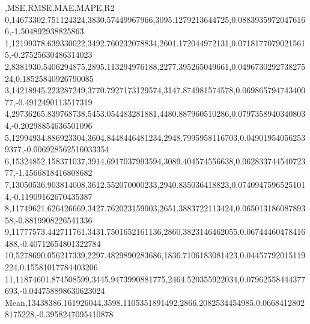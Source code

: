 ,MSE,RMSE,MAE,MAPE,R2
0,14673302.751124324,3830.57449967966,3095.1279213644725,0.08839359720476166,-1.504892938825863
1,12199378.639330022,3492.760232078834,2601.172044972131,0.07181770790215615,-0.27525630486314023
2,8381930.5406294875,2895.113294976188,2277.395265049661,0.049673029273827524,0.18525840926790085
3,14218945.223287249,3770.7927173129574,3147.874981574578,0.06986579474340077,-0.4912490113517319
4,29736265.839768738,5453.054483281881,4480.887960510286,0.07973589403408034,-0.20298854636501096
5,12994934.886923304,3604.8448446481234,2948.7995958116703,0.049019540562539377,-0.006928562516033354
6,15324852.158371037,3914.6917037993594,3089.404574556638,0.06283374454072377,-1.1566818416808682
7,13050536.903814008,3612.552070000233,2940.835036418823,0.07409475965251014,-0.11909162670435387
8,11749621.626426669,3427.762023159903,2651.3883722113424,0.06501318608789358,-0.8819908226541336
9,11777573.442711761,3431.7501652161136,2860.3823146462055,0.06744460478416488,-0.40712654801322784
10,5278690.056217339,2297.4829890283686,1836.7106183081423,0.04457792015119224,0.15581017784403206
11,11874601.874508599,3445.9473990881775,2464.520355922034,0.07962558444377693,-0.044758898630623024
Mean,13438386.161926044,3598.1105351891492,2866.2082534454985,0.06684128028175228,-0.3958247095410878
